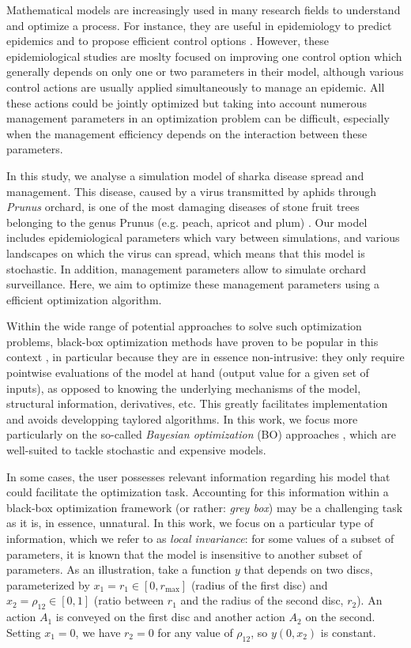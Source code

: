 Mathematical models are increasingly used in many research fields to understand and optimize a process. For instance, 
they are useful in epidemiology to predict epidemics and to propose efficient control options 
\cite{cunniffe2015thirteen,cunniffe2016modeling,mushayabasa2015modeling,tildesley2006optimal,bajardi2012optimizing,kompas2017optimal,vanderwaal2017optimal,grechi2012designing}.
However, these epidemiological studies are moslty focused on improving one control option which generally depends on only one or two parameters in their model, 
although various control actions are usually applied simultaneously to manage an epidemic. All these actions could be jointly optimized but taking into account numerous management parameters in an optimization problem can be difficult,
especially when the management efficiency depends on the interaction between these parameters.

In this study, we analyse a simulation model of sharka disease spread and management. This disease, caused by a virus transmitted by aphids through \textit{Prunus} orchard, 
is one of the most damaging diseases of stone fruit trees belonging to the genus Prunus (e.g. peach, apricot and plum) \cite{cambra2006plum,rimbaud2015sharka}.
Our model includes epidemiological parameters which vary between simulations, and various landscapes on which the virus can spread, which means that this model is stochastic. 
In addition, management parameters allow to simulate orchard surveillance. Here, we aim to optimize these management parameters using a efficient optimization algorithm.

Within the wide range of potential approaches to solve such optimization problems, black-box optimization methods have proven to be popular in this context \cite{rios2013derivative}, 
in particular because they are in essence non-intrusive: they only require pointwise evaluations of the model at hand (output value for a given set of inputs), 
as opposed to knowing the underlying mechanisms of the model, structural information, derivatives, etc. This greatly facilitates implementation and avoids developping taylored algorithms.
In this work, we focus more particularly on the so-called \textit{Bayesian optimization} (BO) approaches \cite{mockus2012bayesian,shahriari2016taking},
which are well-suited to tackle stochastic and expensive models.

In some cases, the user possesses relevant information regarding his model that could facilitate the optimization task.
Accounting for this information within a black-box optimization framework (or rather: \textit{grey box}) may be a challenging task
as it is, in essence, unnatural. In this work, we focus on a particular type of information, which we refer to as \textit{local invariance}:
for some values of a subset of parameters, it is known that the model is insensitive to another subset of parameters. 
As an illustration, take a function $y$ that depends on two discs, parameterized by $x_1=r_1 \in [0, r_{\max}]$ (radius of the first disc) and $x_2=\rho_{12} \in [0,1]$ 
(ratio between $r_1$ and the radius of the second disc, $r_2$). An action $A_1$ is conveyed on the first disc and another action $A_2$ on the second.
Setting $x_1=0$, we have $r_2=0$ for any value of $\rho_{12}$, so $y(0, x_2)$ is constant.

